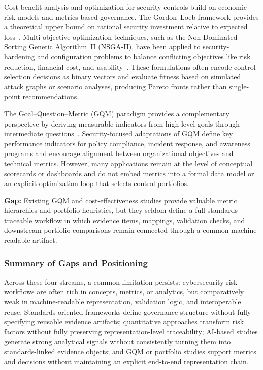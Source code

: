 \documentclass[preprint,12pt]{elsarticle}
\begin{document}
Cost-benefit analysis and optimization for security controls build on economic risk models and metrics-based governance. The Gordon--Loeb framework provides a theoretical upper bound on rational security investment relative to expected loss~\cite{Gordon2002_SecInvest}. Multi-objective optimization techniques, such as the Non-Dominated Sorting Genetic Algorithm~II (NSGA-II), have been applied to security-hardening and configuration problems to balance conflicting objectives like risk reduction, financial cost, and usability~\cite{Rabiei2023_ESWA_NSGAII}. These formulations often encode control-selection decisions as binary vectors and evaluate fitness based on simulated attack graphs or scenario analyses, producing Pareto fronts rather than single-point recommendations.

The Goal--Question--Metric (GQM) paradigm provides a complementary perspective by deriving measurable indicators from high-level goals through intermediate questions~\cite{Basili2014GQM}. Security-focused adaptations of GQM define key performance indicators for policy compliance, incident response, and awareness programs and encourage alignment between organizational objectives and technical metrics. However, many applications remain at the level of conceptual scorecards or dashboards and do not embed metrics into a formal data model or an explicit optimization loop that selects control portfolios.

\noindent\textbf{Gap:} Existing GQM and cost-effectiveness studies provide valuable metric hierarchies and portfolio heuristics, but they seldom define a full standards-traceable workflow in which evidence items, mappings, validation checks, and downstream portfolio comparisons remain connected through a common machine-readable artifact.

\subsubsection{Summary of Gaps and Positioning}
\label{sec:summary-gaps}

Across these four streams, a common limitation persists: cybersecurity risk workflows are often rich in concepts, metrics, or analytics, but comparatively weak in machine-readable representation, validation logic, and interoperable reuse. Standards-oriented frameworks define governance structure without fully specifying reusable evidence artifacts; quantitative approaches transform risk factors without fully preserving representation-level traceability; AI-based studies generate strong analytical signals without consistently turning them into standards-linked evidence objects; and GQM or portfolio studies support metrics and decisions without maintaining an explicit end-to-end representation chain.
\end{document}
